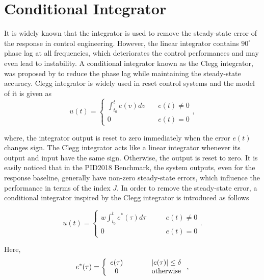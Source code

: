\documentclass{ifacconf}
\begin{document}
\section{Conditional Integrator}
It is widely known that the integrator is used to remove the steady-state error of the response in control engineering. However, the linear integrator contains $90^\circ$ phase lag at all frequencies, which deteriorates the control performances and may even lead to instability. A conditional integrator known as the Clegg integrator, was proposed by \cite{Clegg1958p4142} to reduce the phase lag while maintaining the steady-state accuracy. Clegg integrator is widely used in reset control systems \citep{Banos2011} and the model of it is given as
\begin{equation}
u(t) = \left\{ {\begin{array}{*{20}{c}}
{\int_{{t_0}}^t {e(v)dv\quad } }&{e(t) \ne 0}\\
0&{e(t) = 0}
\end{array}} \right.,
\end{equation}

where, the integrator output is reset to zero immediately when the error $e(t)$ changes sign. The Clegg integrator acts like a linear integrator whenever its output and input have the same sign. Otherwise, the output is reset to zero.
It is easily noticed that in the PID2018 Benchmark, the system outputs, even for the response baseline, generally have non-zero steady-state errors, which influence the performance in terms of the index $J$. In order to remove the steady-state error, a conditional integrator inspired by the Clegg integrator is introduced as follows

\begin{equation}
u(t) = \left\{ {\begin{array}{*{20}{c}}
{w\int_{{t_0}}^t {{e^*}(\tau )} d\tau }&\qquad {e(t) \ne 0}\\
0&\qquad {e(t) = 0}
\end{array}} \right..
\end{equation}

Here,
\begin{equation}
{e^ * }(\tau ) = \left\{ {\begin{array}{*{20}{c}}
{e(\tau )}&&\qquad{\left| {e(\tau )} \right| \le \delta }\\
0&&\qquad{{\rm{otherwise}}}
\end{array}} \right.,
\end{equation}
\end{document}
